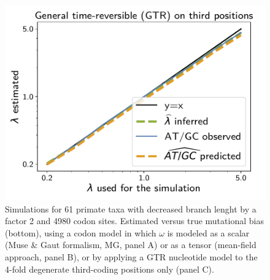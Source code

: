\documentclass{article}
\begin{document}
\begin{figure}[!htb]
    \begin{minipage}{0.325\linewidth}
        \includegraphics[width=\linewidth, page=1]{inference_supp_mat/PrimatesExons10Mu0.5_lambda_GTR.pdf}
    \end{minipage}
    \hfill
    \caption[Estimation of mutational bias]{
        Simulations for 61 primate taxa with decreased branch lenght by a factor 2 and 4980 codon sites.
        Estimated versus true mutational bias (bottom), using a codon model in which $\omega$ is modeled as a scalar (Muse \& Gaut formalism, MG, panel A) or as a tensor (mean-field approach, panel B), or by applying a GTR nucleotide model to the 4-fold degenerate third-coding positions only (panel C).
    }
\end{figure}
\end{document}
